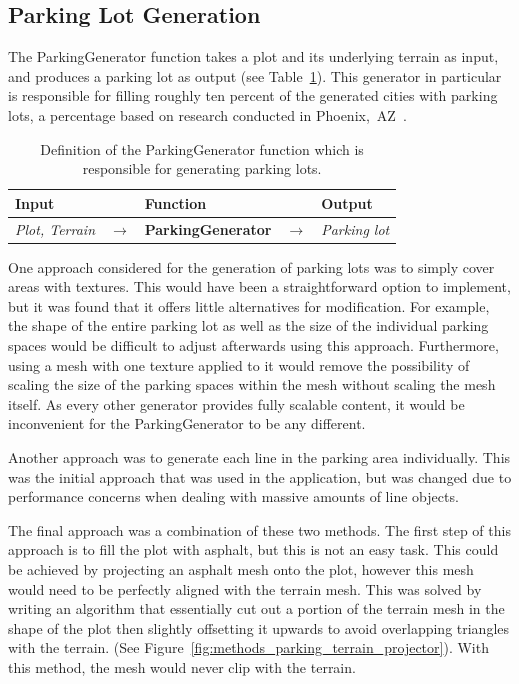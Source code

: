 \subsection{Parking Lot Generation}

The ParkingGenerator function takes a plot and its underlying terrain as input, and produces a parking lot as output (see Table~\ref{table:parking}).
This generator in particular is responsible for filling roughly ten percent of the generated cities with parking lots, a percentage based on research conducted in Phoenix,~AZ~\cite{parking_percent}.

\begin{table}[H]
   \centering
   \begin{tabular}{lllll}
     \textbf{Input}                           &               & \textbf{Function}            &               & \textbf{Output}         \\
     \midrule
     \textit{Plot, Terrain}                   & $\rightarrow$ & \textbf{ParkingGenerator}       & $\rightarrow$ & \textit{Parking lot}           \\
     \bottomrule
   \end{tabular}

   \caption{Definition of the ParkingGenerator function which is responsible for generating parking lots.}
   \label{table:parking}
 \end{table}
 \vspace{-0.4cm}

One approach considered for the generation of parking lots was to simply cover areas with textures.
This would have been a straightforward option to implement, but it was found that it offers little alternatives for modification.
For example, the shape of the entire parking lot as well as the size of the individual parking spaces would be difficult to adjust afterwards using this approach.
Furthermore, using a mesh with one texture applied to it would remove the possibility of scaling the size of the parking spaces within the mesh without scaling the mesh itself.
As every other generator provides fully scalable content, it would be inconvenient for the ParkingGenerator to be any different.

Another approach was to generate each line in the parking area individually. 
This was the initial approach that was used in the application, but was changed due to performance concerns when dealing with massive amounts of line objects.

The final approach was a combination of these two methods.
The first step of this approach is to fill the plot with asphalt, but this is not an easy task.
This could be achieved by projecting an asphalt mesh onto the plot, however this mesh would need to be perfectly aligned with the terrain mesh.
This was solved by writing an algorithm that essentially cut out a portion of the terrain mesh in the shape of the plot then slightly offsetting it upwards to avoid overlapping triangles with the terrain. (See Figure~\ref{fig:methods_parking_terrain_projector}).
With this method, the mesh would never clip with the terrain.

